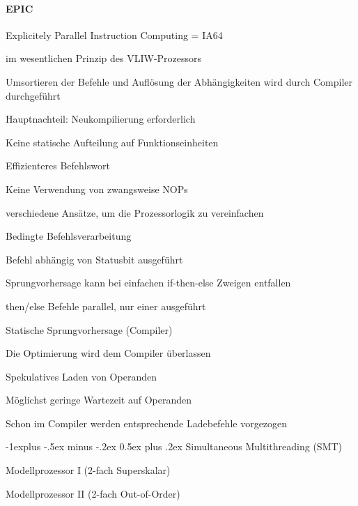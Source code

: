 \documentclass[a4paper]{article}
\makeatletter
\renewcommand{\subsection}{\@startsection{subsection}{2}{0mm}%
                                {-1explus -.5ex minus -.2ex}%
                                {0.5ex plus .2ex}%
                                {\normalfont\normalsize\bfseries}}
\makeatother
\begin{document}
\begin{multicols}{3}
  \paragraph{EPIC} Explicitely Parallel Instruction Computing = IA64
  \begin{itemize*}
    \item im wesentlichen Prinzip des VLIW-Prozessors
    \item Umsortieren der Befehle und Auflösung der Abhängigkeiten wird durch Compiler durchgeführt
    \item Hauptnachteil: Neukompilierung erforderlich
    \item Keine statische Aufteilung auf Funktionseinheiten
    \item Effizienteres Befehlswort
    \item Keine Verwendung von zwangsweise NOPs
  \end{itemize*}
  verschiedene Ansätze, um die Prozessorlogik zu vereinfachen
  \begin{enumerate*}
    \item Bedingte Befehlsverarbeitung
    \begin{itemize*}
      \item Befehl abhängig von Statusbit ausgeführt
      \item Sprungvorhersage kann bei einfachen if-then-else Zweigen entfallen
      \item then/else Befehle parallel, nur einer ausgeführt
    \end{itemize*}
    \item Statische Sprungvorhersage (Compiler)
    \item Die Optimierung wird dem Compiler überlassen
    \item Spekulatives Laden von Operanden
    \begin{itemize*}
      \item Möglichst geringe Wartezeit auf Operanden
      \item Schon im Compiler werden entsprechende Ladebefehle vorgezogen
    \end{itemize*}
  \end{enumerate*}
  
  \subsection{Simultaneous Multithreading (SMT)}
  \begin{itemize*}
    \item Modellprozessor I (2-fach Superskalar)
    \item Modellprozessor II (2-fach Out-of-Order)
  \end{itemize*}
  

\end{multicols}
\end{document}
